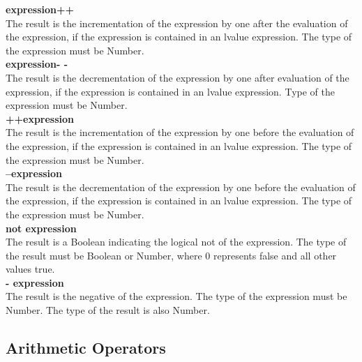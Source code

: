 \documentclass[12pt]{report}
\begin{document}
    \textbf{expression++}\\
      The result is the incrementation of the expression by one after the evaluation of the expression, if the expression is contained in an lvalue expression. The type of the expression must be Number. \\
    \textbf{expression- -}\\
      The result is the decrementation of the expression by one after evaluation of the expression, if the expression is contained in an lvalue expression. Type of the expression must be Number. \\
    \textbf{++expression}\\
      The result is the incrementation of the expression by one before the evaluation of the expression, if the expression is contained in an lvalue expression. The type of the expression must be Number. \\
    \textbf{--expression}\\
      The result is the decrementation of the expression by one before the evaluation of the expression, if the expression is contained in an lvalue expression. The type of the expression must be Number. \\
    \textbf{not expression }\\
      The result is a Boolean indicating the logical not of the expression. The type of the result must be Boolean or Number, where 0 represents false and all other values true. \\
    \textbf{- expression} \\
      The result is the negative of the expression. The type of the expression must be Number. The type of the result is also Number. 

    
    \subsection*{Arithmetic Operators}
    
\end{document}
